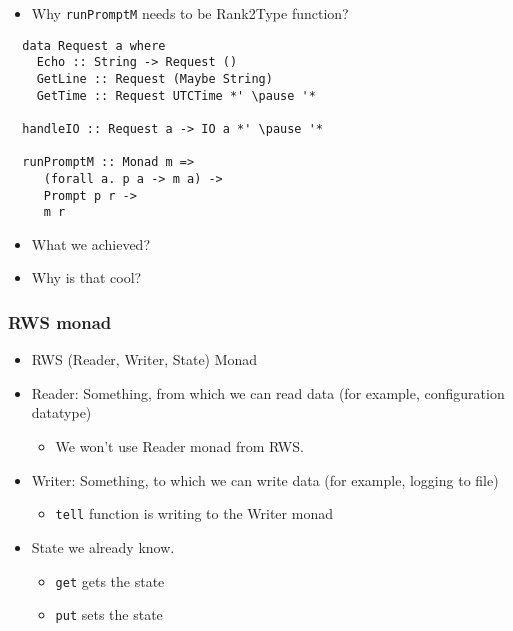 \documentclass[aspectratio=43]{beamer}
\begin{document}
\begin{frame}[fragile]
 \begin{itemize}
  \item Why \texttt{runPromptM} needs to be Rank2Type function?
 \end{itemize}
 \begin{lstlisting}
  data Request a where
    Echo :: String -> Request ()
    GetLine :: Request (Maybe String)
    GetTime :: Request UTCTime *' \pause '*
    
  handleIO :: Request a -> IO a *' \pause '*
  
  runPromptM :: Monad m =>
     (forall a. p a -> m a) ->
     Prompt p r ->
     m r
 \end{lstlisting}
\end{frame}

\begin{frame}
 \begin{itemize}
  \item What we achieved?
  \pause
  \item Why is that cool?
 \end{itemize}
\end{frame}

\begin{frame}
 \frametitle{RWS monad}
 \begin{itemize}
  \item RWS (Reader, Writer, State) Monad
  \pause
  \item Reader: Something, from which we can read data (for example, configuration datatype)
  \pause
  \begin{itemize}
   \item We won't use Reader monad from RWS.
  \end{itemize}
  \pause
  \item Writer: Something, to which we can write data (for example, logging to file)
  \pause
  \begin{itemize}
   \item \texttt{tell} function is writing to the Writer monad
  \end{itemize}
  \pause
  \item State we already know.
  \pause
  \begin{itemize}
   \item \texttt{get} gets the state
   \item \texttt{put} sets the state
  \end{itemize}
 \end{itemize}
\end{frame}
\end{document}
